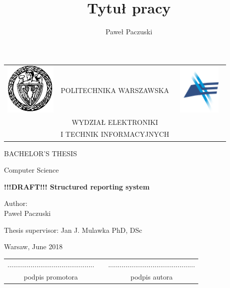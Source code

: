 \documentclass[12pt, twoside, openany]{report}
\author{Paweł Paczuski}
\title{Tytuł pracy}
\theoremstyle{definition}
\begin{document}
\begin{titlepage}
\pagestyle{empty}

\noindent
\begin{Large}
\begin{table}[t]
\centering
\begin{tabular}[t]{lcr}
 \includegraphics[width=70pt,height=70pt]{PW} & POLITECHNIKA WARSZAWSKA & \includegraphics[width=70pt,height=70pt]{ELKA}\\
& WYDZIAŁ ELEKTRONIKI & \\
& I TECHNIK INFORMACYJNYCH &
\end{tabular}
\end{table}

\begin{center}BACHELOR'S THESIS\end{center}
\begin{center}Computer Science\end{center}\end{Large}
\begin{center}
\Huge
\textbf{!!!DRAFT!!! Structured reporting system}
\end{center}
\vfill
\begin{center}
\Large
Author:\\
\LARGE
Paweł Paczuski
\end{center}
\vfill
\begin{center}
\Large
Thesis supervisor: Jan J. Mulawka PhD, DSc
\end{center}
\vfill
\begin{center}
\Large
Warsaw, June 2018
\end{center}
\newpage
\hfill
\begin{table}[b]
\centering
\begin{tabular}[t]{ccc}
............................................. & \hspace*{100pt} & .............................................\\
podpis promotora & \hspace*{100pt} & podpis autora
\end{tabular}
\end{table}


\end{titlepage}
\end{document}

